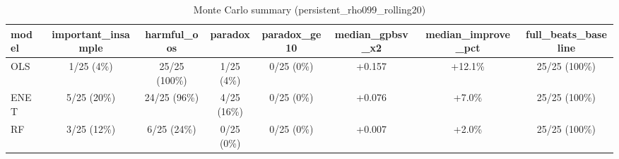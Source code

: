 \begin{table}
\centering
\caption{Monte Carlo summary (persistent_rho099_rolling20)}
\label{tab:persistent_rho099_rolling20}
\begin{tabular}{lccccccc}
\toprule
model & important_insample &    harmful_oos &      paradox & paradox_ge10 & median_gpbsv_x2 & median_improve_pct & full_beats_baseline \\
\midrule
  OLS &         1/25 (4\%) &  25/25 (100\%) &   1/25 (4\%) &   0/25 (0\%) &          +0.157 &            +12.1\% &       25/25 (100\%) \\
 ENET &        5/25 (20\%) &   24/25 (96\%) &  4/25 (16\%) &   0/25 (0\%) &          +0.076 &             +7.0\% &       25/25 (100\%) \\
   RF &        3/25 (12\%) &    6/25 (24\%) &   0/25 (0\%) &   0/25 (0\%) &          +0.007 &             +2.0\% &       25/25 (100\%) \\
\bottomrule
\end{tabular}
\end{table}
